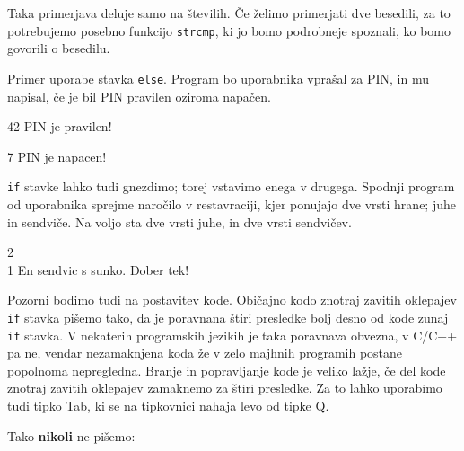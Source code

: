 \documentclass{book}
\begin{document}
\begin{errors}
  Taka primerjava deluje samo na številih. Če želimo primerjati dve besedili,
  za to potrebujemo posebno funkcijo \verb+strcmp+, ki jo bomo
  podrobneje spoznali, ko bomo govorili o besedilu.
\end{errors}

\begin{examples}

Primer uporabe stavka \verb+else+. Program bo uporabnika vprašal za PIN,
in mu napisal, če je bil PIN pravilen oziroma napačen.


\begin{inout}
42
\tcblower
PIN je pravilen!
\end{inout}

\begin{inout}
7
\tcblower
PIN je napacen!
\end{inout}

\end{examples}

\begin{examples}
\verb+if+ stavke lahko tudi gnezdimo; torej vstavimo enega v drugega.
Spodnji program od uporabnika sprejme naročilo v restavraciji, kjer ponujajo
dve vrsti hrane; juhe in sendviče. Na voljo sta dve vrsti juhe, in dve vrsti
sendvičev.


\begin{inout}
2\\
1
\tcblower
En sendvic s sunko. Dober tek!
\end{inout}
\end{examples}


\begin{errors}

Pozorni bodimo tudi na postavitev kode. Običajno kodo znotraj zavitih oklepajev
\verb+if+ stavka pišemo tako, da je poravnana štiri presledke bolj desno od
kode zunaj \verb+if+ stavka. V nekaterih programskih jezikih je taka poravnava
obvezna, v C/C++ pa ne, vendar nezamaknjena koda že v zelo majhnih programih
postane popolnoma nepregledna. Branje in popravljanje kode je veliko lažje, če
del kode znotraj zavitih oklepajev zamaknemo za štiri presledke. Za to lahko
uporabimo tudi tipko Tab, ki se na tipkovnici nahaja levo od tipke Q.

\vspace{0.3cm}
Tako \textbf{nikoli} ne pišemo:


\end{errors}
\end{document}
